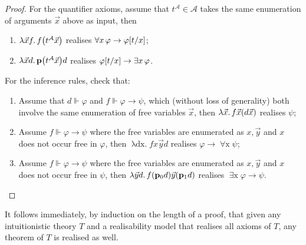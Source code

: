 \documentclass[12pt,openany]{book}
\theoremstyle{plain}
\theoremstyle{definition}
\newcommand\uplabel[1]{\textup{(#1)}}
\newcommand\opA[1]{\mathop{\forall #1}}
\newcommand\opE[1]{\mathop{\exists #1}}
\newcommand\oplam[1]{\mathop{\lambda #1.}}
\newcommand\bp{\mathbf{p}}
\begin{document}
\begin{proof}
  For the quantifier axioms, assume that $t^\mathcal{A} \in \mathcal{A}$ takes the same enumeration of arguments $\vec{x}$ above as input, then
  \begin{enumerate}[label=\uplabel{\arabic*},resume]
    \item $\oplam{\vec{x} f} f \mleft(t^\mathcal{A} \vec{x}\mright)$ realises $\opA{x} \varphi \rightarrow \varphi\mleft[t/x\mright]$;
    \item $\oplam{\vec{x} d} \bp \mleft(t^\mathcal{A} \vec{x}\mright) d$ realises $\varphi\mleft[t/x\mright] \rightarrow \opE{x} \varphi$.
  \end{enumerate}

  For the inference rules, check that:
  \begin{enumerate}[label=\uplabel{\roman*}]
    \item Assume that $d \Vdash \varphi$ and $f \Vdash \varphi \rightarrow \psi$, which (without loss of generality) both involve the same enumeration of free variables $\vec{x}$, then $\oplam{\vec{x}} f \vec{x} \mleft(d \vec{x}\mright)$ realises $\psi$;
          \xdef\intlogicrulesquantcount{\number\value{enumi}+1}
    \item Assume $f \Vdash \varphi \rightarrow \psi$ where the free variables are enumerated as $x, \vec{y}$ and $x$ does not occur free in $\varphi$, then $\oplam{\vec{y} dx} fx \vec{y} d$ realises $\varphi \rightarrow \opA{x} \psi$;
    \item Assume $f \Vdash \varphi \rightarrow \psi$ where the free variables are enumerated as $x, \vec{y}$ and $x$ does not occur free in $\psi$, then $\oplam{\vec{y} d} f \mleft(\bp_0 d\mright) \vec{y} \mleft(\bp_1 d\mright)$ realises $\opE{x} \varphi \rightarrow \psi$. \qedhere
  \end{enumerate}
\end{proof}

It follows immediately, by induction on the length of a proof, that given any intuitionistic theory $T$ and a realisability model that realises all axioms of $T$, any theorem of $T$ is realised as well.
\end{document}
